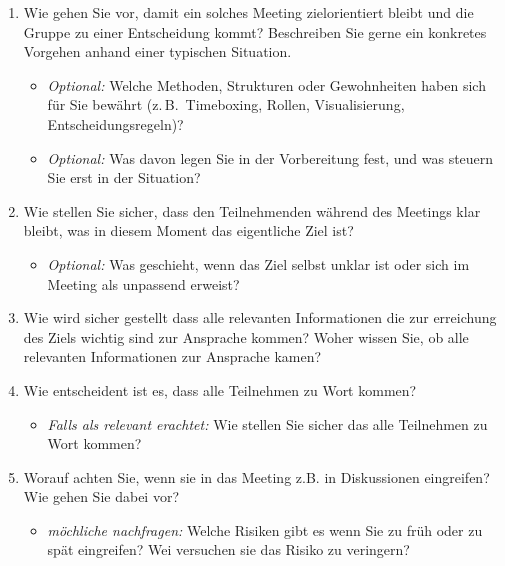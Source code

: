 \begin{enumerate}[label=3.\arabic*, leftmargin=*]
  \item Wie gehen Sie vor, damit ein solches Meeting zielorientiert bleibt und die Gruppe zu einer
    Entscheidung kommt? Beschreiben Sie gerne ein konkretes Vorgehen anhand einer
    typischen Situation.
    \begin{itemize}[label=\textendash]
      \item \textit{Optional:} Welche Methoden, Strukturen oder Gewohnheiten haben sich
        für Sie bewährt (z.\,B.\ Timeboxing, Rollen, Visualisierung, Entscheidungsregeln)?
      \item \textit{Optional:} Was davon legen Sie in der Vorbereitung fest, und was
        steuern Sie erst in der Situation?
    \end{itemize}
  \item Wie stellen Sie sicher, dass den Teilnehmenden während des Meetings klar bleibt,
    was in diesem Moment das eigentliche Ziel ist?
    \begin{itemize}[label=\textendash]
      \item \textit{Optional:} Was geschieht, wenn das Ziel selbst unklar ist oder sich
        im Meeting als unpassend erweist?
    \end{itemize}
  \item Wie wird sicher gestellt dass alle relevanten Informationen die zur erreichung des Ziels wichtig
    sind zur Ansprache kommen? Woher wissen Sie, ob alle relevanten Informationen zur Ansprache kamen?
  \item Wie entscheident ist es, dass alle Teilnehmen zu Wort kommen?
    \begin{itemize}[label=\textendash]
      \item \textit{Falls als relevant erachtet:} Wie stellen Sie sicher das alle Teilnehmen zu Wort kommen?
    \end{itemize}
  \item Worauf achten Sie, wenn sie in das Meeting z.B. in Diskussionen eingreifen? Wie gehen Sie dabei vor?
    \begin{itemize}[label=\textendash]
      \item \textit{möchliche nachfragen:} Welche Risiken gibt es wenn Sie zu früh oder zu spät eingreifen?
        Wei versuchen sie das Risiko zu veringern?
    \end{itemize}
\end{enumerate}

